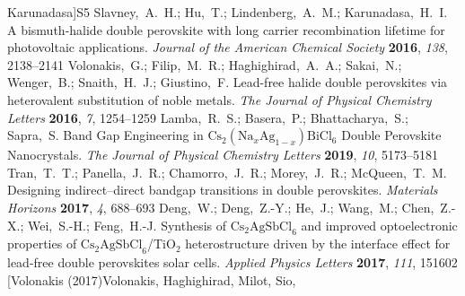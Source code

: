 \documentclass[journal=jpclcd,manuscript=letter]{achemso}
\begin{document}
\begin{mcitethebibliography}{49}
  Karunadasa]{S5}
Slavney,~A.~H.; Hu,~T.; Lindenberg,~A.~M.; Karunadasa,~H.~I. A bismuth-halide
  double perovskite with long carrier recombination lifetime for photovoltaic
  applications. \emph{Journal of the American Chemical Society} \textbf{2016},
  \emph{138}, 2138--2141\relax
\mciteBstWouldAddEndPuncttrue
\mciteSetBstMidEndSepPunct{\mcitedefaultmidpunct}
{\mcitedefaultendpunct}{\mcitedefaultseppunct}\relax
\EndOfBibitem
{}
Volonakis,~G.; Filip,~M.~R.; Haghighirad,~A.~A.; Sakai,~N.; Wenger,~B.;
  Snaith,~H.~J.; Giustino,~F. Lead-free halide double perovskites via
  heterovalent substitution of noble metals. \emph{The Journal of Physical
  Chemistry Letters} \textbf{2016}, \emph{7}, 1254--1259\relax
\mciteBstWouldAddEndPuncttrue
\mciteSetBstMidEndSepPunct{\mcitedefaultmidpunct}
{\mcitedefaultendpunct}{\mcitedefaultseppunct}\relax
\EndOfBibitem
{}
Lamba,~R.~S.; Basera,~P.; Bhattacharya,~S.; Sapra,~S. Band Gap Engineering in
  ${\mathrm{Cs}}_{2}({\mathrm{Na}}_{x}{\mathrm{Ag}}_{1-x}){\mathrm{BiCl}}_{6}$
  Double Perovskite Nanocrystals. \emph{The Journal of Physical Chemistry
  Letters} \textbf{2019}, \emph{10}, 5173--5181\relax
\mciteBstWouldAddEndPuncttrue
\mciteSetBstMidEndSepPunct{\mcitedefaultmidpunct}
{\mcitedefaultendpunct}{\mcitedefaultseppunct}\relax
\EndOfBibitem
{}
Tran,~T.~T.; Panella,~J.~R.; Chamorro,~J.~R.; Morey,~J.~R.; McQueen,~T.~M.
  Designing indirect--direct bandgap transitions in double perovskites.
  \emph{Materials Horizons} \textbf{2017}, \emph{4}, 688--693\relax
\mciteBstWouldAddEndPuncttrue
\mciteSetBstMidEndSepPunct{\mcitedefaultmidpunct}
{\mcitedefaultendpunct}{\mcitedefaultseppunct}\relax
\EndOfBibitem
{}
Deng,~W.; Deng,~Z.-Y.; He,~J.; Wang,~M.; Chen,~Z.-X.; Wei,~S.-H.; Feng,~H.-J.
  Synthesis of ${\mathrm{Cs}}_{2}{\mathrm{AgSbCl}}_{6}$ and improved
  optoelectronic properties of
  ${\mathrm{Cs}}_{2}{\mathrm{AgSbCl}}_{6}$/${\mathrm{TiO}}_{2}$ heterostructure
  driven by the interface effect for lead-free double perovskites solar cells.
  \emph{Applied Physics Letters} \textbf{2017}, \emph{111}, 151602\relax
\mciteBstWouldAddEndPuncttrue
\mciteSetBstMidEndSepPunct{\mcitedefaultmidpunct}
{\mcitedefaultendpunct}{\mcitedefaultseppunct}\relax
\EndOfBibitem
\bibitem[Volonakis (2017)Volonakis, Haghighirad, Milot, Sio,

\end{mcitethebibliography}
\end{document}
